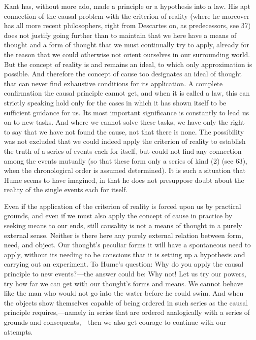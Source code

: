 \documentclass[12pt,a4paper]{book}
\newcommand{\opage}[1]{\marginnote{\footnotesize\textit{[#1]}}}
\begin{document}
Kant has, without more ado, made a principle or a hypothesis into a law. His
apt connection of the causal problem with the criterion of reality (where he
moreover has all more recent philosophers, right from Descartes on, as
predecessors, see 37) does not justify going further than to maintain that we
here have a means of thought and a form of thought that we must continually try
to apply, already for the reason that we could otherwise not orient ourselves
in our surrounding world. But the concept of reality is and remains an ideal, to
which only approximation is possible. And therefore the concept of cause too
designates an ideal of thought that can never find exhaustive conditions for its
application. A complete confirmation the causal principle cannot get, and when
it is called a law, this can strictly speaking hold only for the cases in which
it has shown itself to be sufficient guidance for us. Its most important
significance is constantly to lead us on to new tasks. And where we cannot
solve these tasks, we have only the right to say that \opage{280}we have not found the
cause, not that there is none. The possibility was not excluded that we could
indeed apply the criterion of reality to establish the truth of a series of
events each for itself, but could not find any connection among the events
mutually (so that these form only a series of kind (2) (see 63), when the
chronological order is assumed determined). It is such a situation that Hume
seems to have imagined, in that he does not presuppose doubt about the reality
of the single events each for itself.

Even if the application of the criterion of reality is forced upon us by
practical grounds, and even if we must also apply the concept of cause in
practice by seeking means to our ends, still causality is not a means of thought
in a purely external sense. Neither is there here any purely external relation
between form, need, and object. Our thought's peculiar forms it will have a
spontaneous need to apply, without its needing to be conscious that it is
setting up a hypothesis and carrying out an experiment. To Hume's question: Why
do you apply the causal principle to new events?---the answer could be: Why not!
Let us try our powers, try how far we can get with our thought's forms and
means. We cannot behave like the man who would not go into the water before he
could swim. And when the objects show themselves capable of being ordered in
such series as the causal principle requires,---namely in series that are
ordered analogically with a series of grounds and consequents,---then we also
get courage to continue with our attempts.
\end{document}
